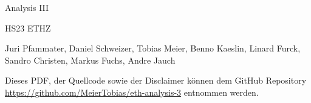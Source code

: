 \documentclass[a4paper,10pt,landscape]{scrartcl}
\begin{document}
\begin{multicols*}{3}
%
\begin{center}
    \huge{Analysis III \par}
    \vspace{0.1cm}
    \large{HS23 ETHZ\par}
    \vspace{0.3cm}
    \normalsize{Juri Pfammater, Daniel Schweizer, Tobias Meier, Benno Kaeslin, Linard Furck, Sandro Christen, Markus Fuchs, Andre Jauch}
    \vspace{0.3cm}
\end{center}    
Dieses PDF, der Quellcode sowie der Disclaimer können dem GitHub Repository \url{https://github.com/MeierTobias/eth-analysis-3} entnommen werden.
\vspace{0.2cm}



%

%  
\end{multicols*}
%
\end{document}

